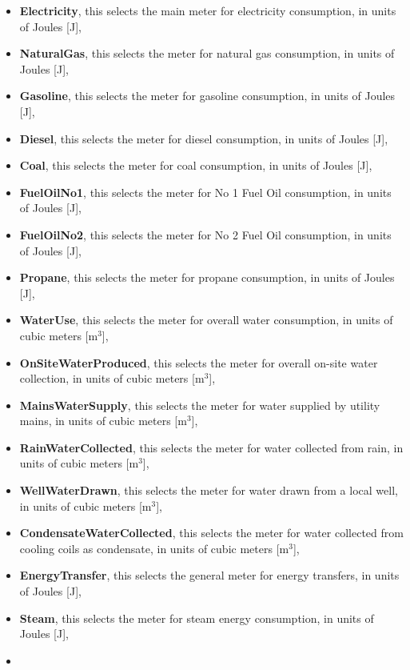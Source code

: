 \begin{itemize}
\item
  \textbf{Electricity}, this selects the main meter for electricity consumption, in units of Joules {[}J{]},
\item
  \textbf{NaturalGas}, this selects the meter for natural gas consumption, in units of Joules {[}J{]},
\item
  \textbf{Gasoline}, this selects the meter for gasoline consumption, in units of Joules {[}J{]},
\item
  \textbf{Diesel}, this selects the meter for diesel consumption, in units of Joules {[}J{]},
\item
  \textbf{Coal}, this selects the meter for coal consumption, in units of Joules {[}J{]},
\item
  \textbf{FuelOilNo1}, this selects the meter for No 1 Fuel Oil consumption, in units of Joules {[}J{]},
\item
  \textbf{FuelOilNo2}, this selects the meter for No 2 Fuel Oil consumption, in units of Joules {[}J{]},
\item
  \textbf{Propane}, this selects the meter for propane consumption, in units of Joules {[}J{]},
\item
  \textbf{WaterUse}, this selects the meter for overall water consumption, in units of cubic meters {[}m\(^{3}\){]},
\item
  \textbf{OnSiteWaterProduced}, this selects the meter for overall on-site water collection, in units of cubic meters {[}m\(^{3}\){]},
\item
  \textbf{MainsWaterSupply}, this selects the meter for water supplied by utility mains, in units of cubic meters {[}m\(^{3}\){]},
\item
  \textbf{RainWaterCollected}, this selects the meter for water collected from rain, in units of cubic meters {[}m\(^{3}\){]},
\item
  \textbf{WellWaterDrawn}, this selects the meter for water drawn from a local well, in units of cubic meters {[}m\(^{3}\){]},
\item
  \textbf{CondensateWaterCollected}, this selects the meter for water collected from cooling coils as condensate, in units of cubic meters {[}m\(^{3}\){]},
\item
  \textbf{EnergyTransfer}, this selects the general meter for energy transfers, in units of Joules {[}J{]},
\item
  \textbf{Steam}, this selects the meter for steam energy consumption, in units of Joules {[}J{]},
\item

\end{itemize}
